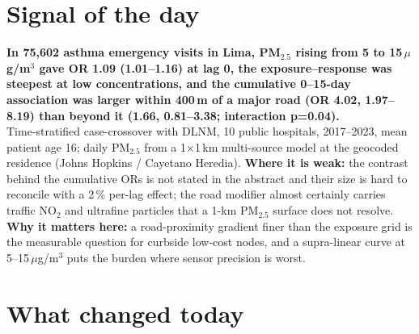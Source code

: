 \documentclass[10pt]{article}
\begin{document}
\vspace{6mm}

\section*{\sffamily\bfseries\color{Deep}Signal of the day}
\vspace{-1.5mm}{\color{Amber}\rule{\linewidth}{1.1pt}}\vspace{2.5mm}

\begin{keybox}
{\sffamily\bfseries\small\color{Deep}In 75,602 asthma emergency visits in Lima, PM$_{2.5}$ rising from 5 to 15\,$\mu$g/m$^3$ gave OR 1.09 (1.01--1.16) at lag 0, the exposure--response was steepest at low concentrations, and the cumulative 0--15-day association was larger within 400\,m of a major road (OR 4.02, 1.97--8.19) than beyond it (1.66, 0.81--3.38; interaction p=0.04).}\\[1.4mm]
\footnotesize
Time-stratified case-crossover with DLNM, 10 public hospitals, 2017--2023, mean patient age 16; daily PM$_{2.5}$ from a 1$\times$1\,km multi-source model at the geocoded residence (Johns Hopkins / Cayetano Heredia).
\textbf{Where it is weak:} the contrast behind the cumulative ORs is not stated in the abstract and their size is hard to reconcile with a 2\,\% per-lag effect; the road modifier almost certainly carries traffic NO$_2$ and ultrafine particles that a 1-km PM$_{2.5}$ surface does not resolve.
\textbf{Why it matters here:} a road-proximity gradient finer than the exposure grid is the measurable question for curbside low-cost nodes, and a supra-linear curve at 5--15\,$\mu$g/m$^3$ puts the burden where sensor precision is worst.\par
\end{keybox}

\vspace{3mm}

\section*{\sffamily\bfseries\color{Deep}What changed today}
\vspace{-1.5mm}{\color{Amber}\rule{\linewidth}{1.1pt}}\vspace{2.5mm}
\end{document}
